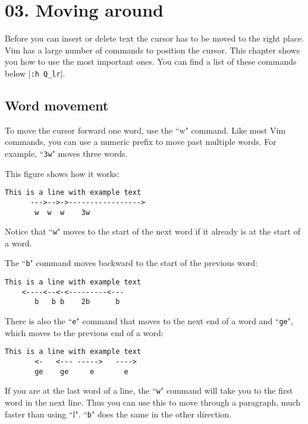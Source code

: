 \section{03. Moving around}
Before you can insert or delete text the cursor has to be moved to the right
place.  Vim has a large number of commands to position the cursor.  This
chapter shows you how to use the most important ones.  You can find a list of
these commands below |\texttt{:h Q\_lr}|.
\localtableofcontents
\subsection{Word movement}

To move the cursor forward one word, use the ``w" command.
Like most Vim commands, you can use a numeric prefix to move past multiple words.
For example, ``\texttt{3w}" moves three words.

This figure shows how it works:

		\begin{Verbatim}[samepage=true]
    This is a line with example text 
      --->-->->----------------->
       w  w  w    3w
		\end{Verbatim}

Notice that ``\texttt{w}" moves to the start of the next word if it already is at the start of a word.

The ``\texttt{b}" command moves backward to the start of the previous word:

		\begin{Verbatim}[samepage=true]
    This is a line with example text 
    <----<--<-<---------<---
       b   b b    2b      b
		\end{Verbatim}

There is also the ``\texttt{e}" command that moves to the next end of a word and ``\texttt{ge}", which moves to the previous end of a word:

		\begin{Verbatim}[samepage=true]
    This is a line with example text 
       <-   <--- ----->   ---->
       ge    ge     e       e
		\end{Verbatim}

If you are at the last word of a line, the ``\texttt{w}" command will take you to the first word in the next line.
Thus you can use this to move through a paragraph, much faster than using ``l".
``\texttt{b}" does the same in the other direction.

